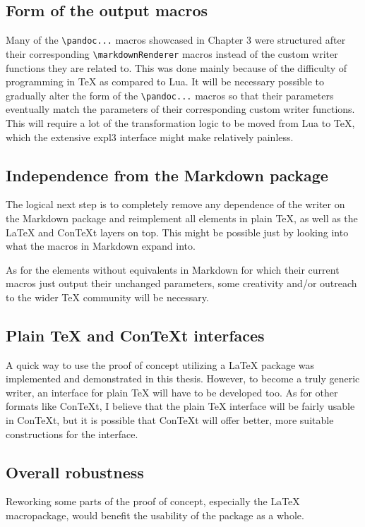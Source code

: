 \documentclass[
  digital,     %
  oneside,     %
  nosansbold,  %
  nocolorbold, %
  lof,         %
  nolot,       %
]{fithesis4}
\newcommand\macro[1]{\texttt{\textbackslash{}{#1}}}
\newcommand\renderer[1]{\macro{markdown\-Renderer\-{#1}}}
\begin{document}
\subsection{Form of the output macros}
Many of the \macro{pandoc...} macros showcased in Chapter 3 were structured after their corresponding \renderer{...} macros instead of the custom writer functions they are related to. This was done mainly because of the difficulty of programming in \TeX{} as compared to Lua. It will be necessary possible to gradually alter the form of the \macro{pandoc...} macros so that their parameters eventually match the parameters of their corresponding custom writer functions. This will require a lot of the transformation logic to be moved from Lua to \TeX{}, which the extensive expl3 interface might make relatively painless.

\subsection{Independence from the Markdown package}
The logical next step is to completely remove any dependence of the writer on the Markdown package and reimplement all elements in plain \TeX{}, as well as the \LaTeX{} and Con\TeX{}t layers on top. This might be possible just by looking into what the macros in Markdown expand into.

As for the elements without equivalents in Markdown for which their current macros just output their unchanged parameters, some creativity and/or outreach to the wider \TeX{} community will be necessary.

\subsection{Plain \TeX{} and Con\TeX{}t interfaces}
A quick way to use the proof of concept utilizing a \LaTeX{} package was implemented and demonstrated in this thesis. However, to become a truly generic writer, an interface for plain \TeX{} will have to be developed too. As for other formats like Con\TeX{}t, I believe that the plain \TeX{} interface will be fairly usable in Con\TeX{}t, but it is possible that Con\TeX{}t will offer better, more suitable constructions for the interface.

\subsection{Overall robustness}
Reworking some parts of the proof of concept, especially the \LaTeX{} macropackage, would benefit the usability of the package as a whole.
\end{document}
